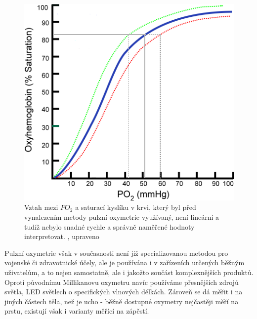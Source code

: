 \begin{figure}[H]
  \includegraphics[scale=1, center]{Kapitoly/Teoreticka/Obrazky/TlakKysliku.png}
  \caption [Vztah mezi $PO_2$ a saturací kyslíku v krvi]{Vztah mezi $PO_2$ a saturací kyslíku v krvi, který byl před vynalezením metody pulzní oxymetrie využívaný, není lineární a tudíž nebylo snadné rychle a správně naměřené hodnoty interpretovat. \citep{ratznium_2006}, upraveno}
  \label{fig:PO2}
\end{figure}
\par Pulzní oxymetrie však v současnosti není již specializovanou metodou pro vojenské či zdravotnické účely, ale je používána i v zařízeních určených běžným uživatelům, a to nejen samostatně, ale i jakožto součást komplexnějších produktů. Oproti původnímu Millikanovu oxymetru navíc používáme přesnějších zdrojů světla, LED světlech o specifických vlnových délkách. Zároveň se dá měřit i na jiných částech těla, než je ucho - běžně dostupné oxymetry nejčastěji měří na prstu, existují však i varianty měřící na zápěstí.
